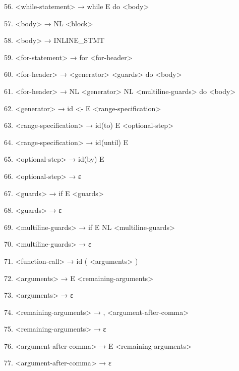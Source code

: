 \documentclass{article}
\begin{document}
56. \textless while-statement\textgreater{} → while E do \textless body\textgreater{}

57. \textless body\textgreater{} → NL \textless block\textgreater{}

58. \textless body\textgreater{} → INLINE\_STMT

59. \textless for-statement\textgreater{} → for \textless for-header\textgreater{}

60. \textless for-header\textgreater{} → \textless generator\textgreater{} \textless guards\textgreater{} do \textless body\textgreater{}

61. \textless for-header\textgreater{} → NL \textless generator\textgreater{} NL \textless multiline-guards\textgreater{} do \textless body\textgreater{}

62. \textless generator\textgreater{} → id \textless- E \textless range-specification\textgreater{}

63. \textless range-specification\textgreater{} → id(to) E \textless optional-step\textgreater{}

64. \textless range-specification\textgreater{} → id(until) E

65. \textless optional-step\textgreater{} → id(by) E

66. \textless optional-step\textgreater{} → ε

67. \textless guards\textgreater{} → if E \textless guards\textgreater{}

68. \textless guards\textgreater{} → ε

69. \textless multiline-guards\textgreater{} → if E NL \textless multiline-guards\textgreater{}

70. \textless multiline-guards\textgreater{} → ε

71. \textless function-call\textgreater{} → id ( \textless arguments\textgreater{} )

72. \textless arguments\textgreater{} → E \textless remaining-arguments\textgreater{}

73. \textless arguments\textgreater{} → ε

74. \textless remaining-arguments\textgreater{} → , \textless argument-after-comma\textgreater{}

75. \textless remaining-arguments\textgreater{} → ε

76. \textless argument-after-comma\textgreater{} → E \textless remaining-arguments\textgreater{}

77. \textless argument-after-comma\textgreater{} → ε
\end{document}
